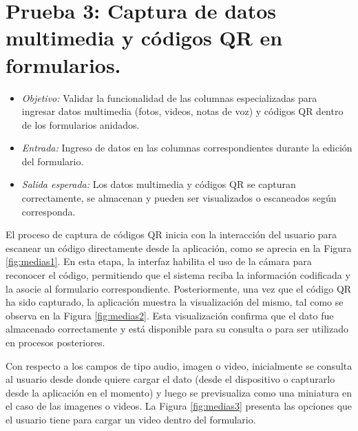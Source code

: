 \documentclass[12pt, a4paper]{book}
\begin{document}
\section{Prueba 3: Captura de datos multimedia y códigos QR en formularios.}
\begin{itemize}
  \item \textit{Objetivo:} Validar la funcionalidad de las columnas especializadas para ingresar datos multimedia (fotos, videos, notas de voz) y códigos QR dentro de los formularios anidados.
  \item \textit{Entrada:} Ingreso de datos en las columnas correspondientes durante la edición del formulario.
  \item \textit{Salida esperada:} Los datos multimedia y códigos QR se capturan correctamente, se almacenan y pueden ser visualizados o escaneados según corresponda.
\end{itemize}

El proceso de captura de códigos QR inicia con la interacción del usuario para escanear un código directamente desde la aplicación, como se aprecia en la Figura \ref{fig:medias1}. En esta etapa, la interfaz habilita el uso de la cámara para reconocer el código, permitiendo que el sistema reciba la información codificada y la asocie al formulario correspondiente. Posteriormente, una vez que el código QR ha sido capturado, la aplicación muestra la visualización del mismo, tal como se observa en la Figura \ref{fig:medias2}. Esta visualización confirma que el dato fue almacenado correctamente y está disponible para su consulta o para ser utilizado en procesos posteriores.

Con respecto a los campos de tipo audio, imagen o video, inicialmente se consulta al usuario desde donde quiere cargar el dato (desde el dispositivo o capturarlo desde la aplicación en el momento) y luego se previsualiza como una miniatura en el caso de las imagenes o videos. La Figura \ref{fig:medias3} presenta las opciones que el usuario tiene para cargar un video dentro del formulario.
\end{document}
